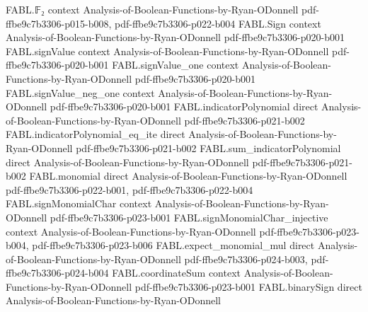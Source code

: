 \begin{theorem}
\label{FABL.card_goldreichLevinRetained_le_activeCap_of_stageAccurate}
\leanok
{}
\proofstep
  {FABL.𝔽₂}
  {context}
  {Analysis-of-Boolean-Functions-by-Ryan-ODonnell}
  {pdf-ffbe9c7b3306-p015-b008,
    pdf-ffbe9c7b3306-p022-b004}
\proofstep
  {FABL.Sign}
  {context}
  {Analysis-of-Boolean-Functions-by-Ryan-ODonnell}
  {pdf-ffbe9c7b3306-p020-b001}
\proofstep
  {FABL.signValue}
  {context}
  {Analysis-of-Boolean-Functions-by-Ryan-ODonnell}
  {pdf-ffbe9c7b3306-p020-b001}
\proofstep
  {FABL.signValue_one}
  {context}
  {Analysis-of-Boolean-Functions-by-Ryan-ODonnell}
  {pdf-ffbe9c7b3306-p020-b001}
\proofstep
  {FABL.signValue_neg_one}
  {context}
  {Analysis-of-Boolean-Functions-by-Ryan-ODonnell}
  {pdf-ffbe9c7b3306-p020-b001}
\proofstep
  {FABL.indicatorPolynomial}
  {direct}
  {Analysis-of-Boolean-Functions-by-Ryan-ODonnell}
  {pdf-ffbe9c7b3306-p021-b002}
\proofstep
  {FABL.indicatorPolynomial_eq_ite}
  {direct}
  {Analysis-of-Boolean-Functions-by-Ryan-ODonnell}
  {pdf-ffbe9c7b3306-p021-b002}
\proofstep
  {FABL.sum_indicatorPolynomial}
  {direct}
  {Analysis-of-Boolean-Functions-by-Ryan-ODonnell}
  {pdf-ffbe9c7b3306-p021-b002}
\proofstep
  {FABL.monomial}
  {direct}
  {Analysis-of-Boolean-Functions-by-Ryan-ODonnell}
  {pdf-ffbe9c7b3306-p022-b001,
    pdf-ffbe9c7b3306-p022-b004}
\proofstep
  {FABL.signMonomialChar}
  {context}
  {Analysis-of-Boolean-Functions-by-Ryan-ODonnell}
  {pdf-ffbe9c7b3306-p023-b001}
\proofstep
  {FABL.signMonomialChar_injective}
  {context}
  {Analysis-of-Boolean-Functions-by-Ryan-ODonnell}
  {pdf-ffbe9c7b3306-p023-b004,
    pdf-ffbe9c7b3306-p023-b006}
\proofstep
  {FABL.expect_monomial_mul}
  {direct}
  {Analysis-of-Boolean-Functions-by-Ryan-ODonnell}
  {pdf-ffbe9c7b3306-p024-b003,
    pdf-ffbe9c7b3306-p024-b004}
\proofstep
  {FABL.coordinateSum}
  {context}
  {Analysis-of-Boolean-Functions-by-Ryan-ODonnell}
  {pdf-ffbe9c7b3306-p023-b001}
\proofstep
  {FABL.binarySign}
  {direct}
  {Analysis-of-Boolean-Functions-by-Ryan-ODonnell}

\end{theorem}
